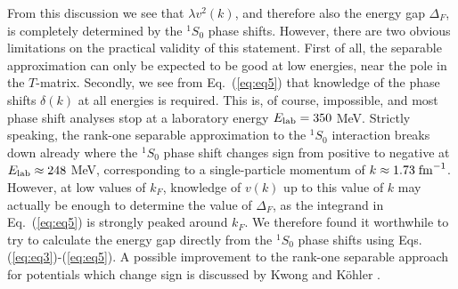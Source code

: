 \begin{multicols}{2}
 From this discussion we see that $\lambda v^2(k)$, and therefore also 
the energy gap $\Delta_F$, is completely determined by the $^1S_0$ 
phase shifts.  However, there are two obvious limitations on the 
practical validity of this statement.  First of all, the separable 
approximation can only be expected to be good at low energies, near the 
pole in the $T$-matrix.  Secondly, we see from Eq.\ (\ref{eq:eq5}) that 
knowledge of the phase shifts $\delta(k)$ at all energies is required.  
This is, of course, impossible, and most phase shift 
analyses stop at a laboratory energy $E_{\rm lab}=350$ MeV.  
Strictly speaking, the rank-one separable  approximation to the 
$^1S_0$ interaction breaks down already where the 
$^1S_0$ phase shift changes sign from positive to negative at 
$E_{\rm lab}\approx 248$ MeV, corresponding to a single-particle momentum 
of $k\approx1.73\;{\rm fm}^{-1}$.  However, at low values of $k_F$, knowledge 
of $v(k)$ up to this value of $k$ may actually be enough to determine 
the value of $\Delta_F$, as the integrand in Eq.\ (\ref{eq:eq5}) is 
strongly peaked around $k_F$.  We therefore found it worthwhile to 
try to calculate the energy gap directly from the $^1S_0$ phase shifts 
using Eqs. (\ref{eq:eq3})-(\ref{eq:eq5}). 
A possible improvement to the rank-one
separable approach for potentials which change sign is discussed by
Kwong and K\"ohler \cite{kk97}. 


\end{multicols}
